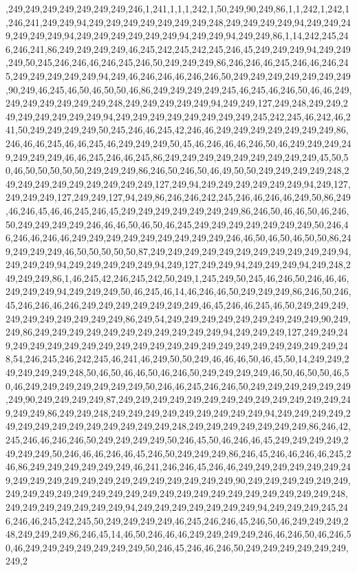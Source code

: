 ,249,249,249,249,249,249,249,246,1,241,1,1,1,242,1,50,249,90,249,86,1,1,242,1,242,1,246,241,249,249,94,249,249,249,249,249,249,249,248,249,249,249,249,94,249,249,249,249,249,249,94,249,249,249,249,249,249,94,249,249,94,249,249,86,1,14,242,245,246,246,241,86,249,249,249,249,46,245,242,245,242,245,246,45,249,249,249,94,249,249,249,50,245,246,246,46,246,245,246,50,249,249,249,86,246,246,46,245,246,46,246,245,249,249,249,249,249,94,249,46,246,246,46,246,246,50,249,249,249,249,249,249,249,90,249,46,245,46,50,46,50,50,46,86,249,249,249,249,245,46,245,46,246,50,46,46,249,249,249,249,249,249,249,248,249,249,249,249,249,94,249,249,127,249,248,249,249,249,249,249,249,249,249,94,249,249,249,249,249,249,249,249,245,242,245,46,242,46,241,50,249,249,249,249,50,245,246,46,245,42,246,46,249,249,249,249,249,249,249,86,246,46,46,245,46,46,245,46,249,249,249,50,45,46,246,46,46,246,50,46,249,249,249,249,249,249,249,46,46,245,246,46,245,86,249,249,249,249,249,249,249,249,249,45,50,50,46,50,50,50,50,50,249,249,249,86,246,50,246,50,46,49,50,50,249,249,249,249,248,249,249,249,249,249,249,249,249,249,127,249,94,249,249,249,249,249,249,94,249,127,249,249,249,127,249,249,127,94,249,86,246,246,242,245,246,46,246,46,249,50,86,249,46,246,45,46,46,245,246,45,249,249,249,249,249,249,249,86,246,50,46,46,50,46,246,50,249,249,249,249,246,46,46,50,46,50,46,245,249,249,249,249,249,249,249,50,246,46,246,46,246,46,249,249,249,249,249,249,249,249,249,246,46,50,46,50,46,50,50,86,249,249,249,249,46,50,50,50,50,50,87,249,249,249,249,249,249,249,249,249,249,249,94,249,249,249,94,249,249,249,249,249,94,249,127,249,249,94,249,249,249,94,249,248,249,249,249,86,1,46,245,42,246,245,242,50,249,1,245,249,50,245,46,246,50,246,46,46,249,249,249,94,249,249,249,50,46,245,46,14,46,246,46,50,249,249,249,86,246,50,246,45,246,246,46,246,249,249,249,249,249,249,249,46,45,246,46,245,46,50,249,249,249,249,249,249,249,249,249,249,86,249,54,249,249,249,249,249,249,249,249,249,90,249,249,86,249,249,249,249,249,249,249,249,249,249,249,94,249,249,249,127,249,249,249,249,249,249,249,249,249,249,249,249,249,249,249,249,249,249,249,249,249,249,248,54,246,245,246,242,245,46,241,46,249,50,50,249,46,46,46,50,46,45,50,14,249,249,249,249,249,249,248,50,46,50,46,46,50,46,246,50,249,249,249,249,46,50,46,50,50,46,50,46,249,249,249,249,249,249,249,50,246,46,245,246,246,50,249,249,249,249,249,249,249,90,249,249,249,249,87,249,249,249,249,249,249,249,249,249,249,249,249,249,249,249,249,86,249,249,248,249,249,249,249,249,249,249,249,249,94,249,249,249,249,249,249,249,249,249,249,249,249,249,249,248,249,249,249,249,249,249,249,86,246,42,245,246,46,246,246,50,249,249,249,249,50,246,45,50,46,246,46,45,249,249,249,249,249,249,249,50,246,46,46,246,46,45,246,50,249,249,249,86,246,45,246,46,246,46,245,246,86,249,249,249,249,249,249,46,241,246,246,45,246,46,249,249,249,249,249,249,249,249,249,249,249,249,249,249,249,249,249,249,249,249,90,249,249,249,249,249,249,249,249,249,249,249,249,249,249,249,249,249,249,249,249,249,249,249,249,249,248,249,249,249,249,249,249,249,94,249,249,249,249,249,249,249,94,249,249,249,245,246,246,46,245,242,245,50,249,249,249,249,46,245,246,246,45,246,50,46,249,249,249,248,249,249,249,86,246,45,14,46,50,246,46,46,249,249,249,249,246,46,246,50,46,246,50,46,249,249,249,249,249,249,249,50,246,45,246,46,246,50,249,249,249,249,249,249,249,2
